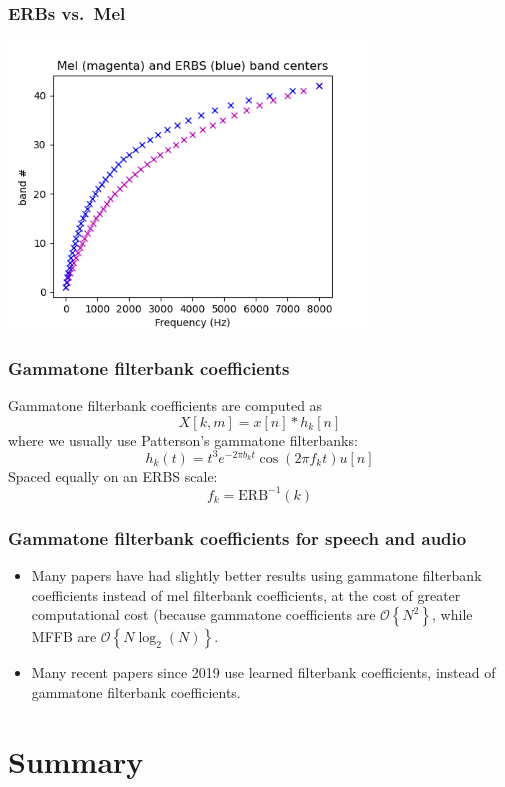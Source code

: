 \documentclass{beamer}
\begin{document}
\begin{frame}
  \frametitle{ERBs vs.~Mel}

  \centerline{\includegraphics[height=3in]{mel_vs_erbs.png}}
\end{frame}

\begin{frame}
  \frametitle{Gammatone filterbank coefficients}

  Gammatone filterbank coefficients are computed as
  \[
  X[k,m] = x[n]\ast h_k[n]
  \]
  where we usually use Patterson's gammatone filterbanks:
  \[
  h_k(t) = t^3 e^{-2\pi b_kt}\cos(2\pi f_k t)u[n]
  \]
  Spaced equally on an ERBS scale:
  \[
  f_k = \mbox{ERB}^{-1}(k)
  \]
\end{frame}

\begin{frame}
  \frametitle{Gammatone filterbank coefficients for speech and audio}
  \begin{itemize}
  \item Many papers have had slightly better results using gammatone filterbank coefficients
    instead of mel filterbank coefficients, at the cost of greater computational cost
    (because gammatone coefficients are ${\mathcal O}\left\{N^2\right\}$, while
    MFFB are ${\mathcal O}\left\{N\log_2(N)\right\}$.
  \item Many recent papers since 2019 use learned filterbank
    coefficients, instead of gammatone filterbank coefficients.
  \end{itemize}
\end{frame}
  
\section[Summary]{Summary}
\setcounter{subsection}{1}
\end{document}
